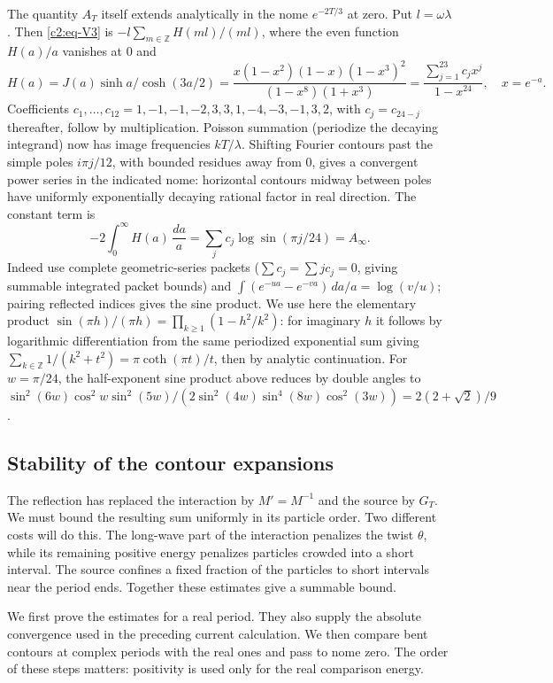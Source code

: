 The quantity \(A_T\) itself extends analytically in the nome \(e^{-2T/3}\) at zero. Put \(l=\omega\lambda\). Then \eqref{c2:eq-V3} is \(-l\sum_{m\in\mathbb Z} H(ml)/(ml)\), where the even function \(H(a)/a\) vanishes at 0 and
\[
 H(a)=J(a)\sinh a/\cosh(3a/2)
 =\frac{x(1-x^2)(1-x)(1-x^3)^2}{(1-x^8)(1+x^3)}
 =\frac{\sum_{j=1}^{23} c_j x^j}{1-x^{24}},\quad x=e^{-a}.
\]
Coefficients \(c_1,\ldots,c_{12}=1,-1,-1,-2,3,3,1,-4,-3,-1,3,2\), with \(c_j=c_{24-j}\) thereafter, follow by multiplication. Poisson summation (periodize the decaying integrand) now has image frequencies \(kT/\lambda\). Shifting Fourier contours past the simple poles \(i\pi j/12\), with bounded residues away from 0, gives a convergent power series in the indicated nome: horizontal contours midway between poles have uniformly exponentially decaying rational factor in real direction. The constant term is
\[
 -2\int_0^\infty H(a)\,\frac{da}{a}=\sum_j c_j\log\sin(\pi j/24)=A_\infty .
\]
Indeed use complete geometric-series packets (\(\sum c_j=\sum j c_j=0\), giving summable integrated packet bounds) and \(\int(e^{-u a}-e^{-v a})\,da/a=\log(v/u)\); pairing reflected indices gives the sine product. We use here the elementary product \(\sin(\pi h)/(\pi h)=\prod_{k\ge1}(1-h^2/k^2)\): for imaginary \(h\) it follows by logarithmic differentiation from the same periodized exponential sum giving \(\sum_{k\in\mathbb Z}1/(k^2+t^2)=\pi\coth(\pi t)/t\), then by analytic continuation. For \(w=\pi/24\), the half-exponent sine product above reduces by double angles to
\(\sin^2(6w)\cos^2w\sin^2(5w)/(2\sin^2(4w)\sin^4(8w)\cos^2(3w))=2(2+\sqrt2)/9\).

\subsection{Stability of the contour expansions}
\label{c2:sec-stability}

The reflection has replaced the interaction by \(M'=M^{-1}\) and the
source by \(G_T\). We must bound the resulting sum uniformly in its
particle order. Two different costs will do this. The long-wave part of
the interaction penalizes the twist \(\theta\), while its remaining
positive energy penalizes particles crowded into a short interval. The
source confines a fixed fraction of the particles to short intervals near
the period ends. Together these estimates give a summable bound.

We first prove the estimates for a real period. They also supply the
absolute convergence used in the preceding current calculation. We then
compare bent contours at complex periods with the real ones and pass to
nome zero. The order of these steps matters: positivity is used only for
the real comparison energy.


